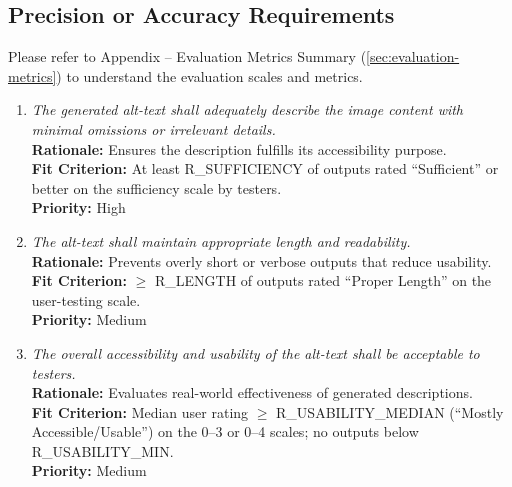 \documentclass[12pt]{article}
\begin{document}
\subsection{Precision or Accuracy Requirements}
Please refer to Appendix – Evaluation Metrics Summary (\ref{sec:evaluation-metrics}) to understand the evaluation scales and metrics.
\begin{enumerate}[label=PR-PAR \arabic*., wide=0pt, leftmargin=*]
\item \emph{The generated alt-text shall adequately describe the image content with minimal omissions or irrelevant details.}\\[2mm] 
    {\bf Rationale:} Ensures the description fulfills its accessibility purpose.\\
    {\bf Fit Criterion:} At least R\_SUFFICIENCY of outputs rated “Sufficient” or better on the sufficiency scale by testers.\\
    {\bf Priority:} High

\item \emph{The alt-text shall maintain appropriate length and readability.}\\[2mm] 
    {\bf Rationale:} Prevents overly short or verbose outputs that reduce usability.\\
    {\bf Fit Criterion:} $\geq$ R\_LENGTH of outputs rated “Proper Length” on the user-testing scale.\\
    {\bf Priority:} Medium

\item \emph{The overall accessibility and usability of the alt-text shall be acceptable to testers.}\\[2mm] 
    {\bf Rationale:} Evaluates real-world effectiveness of generated descriptions.\\
    {\bf Fit Criterion:} Median user rating $\geq$ R\_USABILITY\_MEDIAN (“Mostly Accessible/Usable”) on the 0–3 or 0–4 scales; no outputs below R\_USABILITY\_MIN.\\
    {\bf Priority:} Medium
\end{enumerate}
\end{document}
